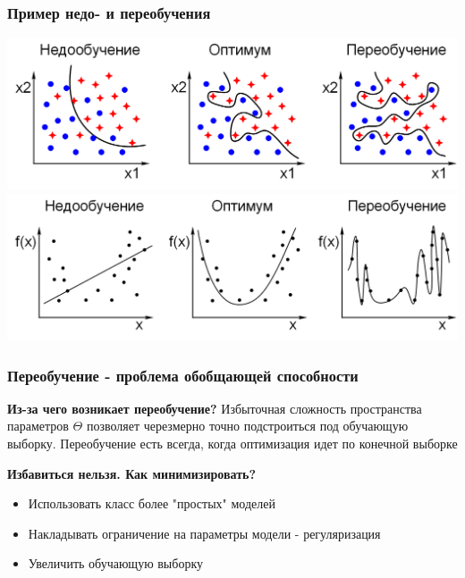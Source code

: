 \documentclass{beamer}
\begin{document}
	
	\begin{frame}
		\frametitle{Пример недо- и переобучения}
		
		\includegraphics[width=\textwidth]{img/overfit1.png}
		\includegraphics[width=\textwidth]{img/overfit2.png}
	\end{frame}


	\begin{frame}
		\frametitle{Переобучение - проблема обобщающей способности}

			\textbf{Из-за чего возникает переобучение?}
			Избыточная сложность пространства параметров $\Theta$ позволяет черезмерно точно подстроиться под обучающую выборку. Переобучение есть всегда, когда оптимизация идет по конечной выборке
			
			\vspace{15pt}
			
			\textbf{Избавиться нельзя. Как минимизировать?}
			\begin{itemize}
				\item Использовать класс более "простых" моделей
				\item Накладывать ограничение на параметры модели - регуляризация
				\item Увеличить обучающую выборку
			\end{itemize}
	\end{frame}
\end{document}
